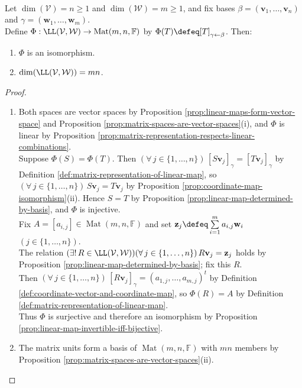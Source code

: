 \begin{theorem} \label{thm:linear-maps-and-matrices-same-data} \\
Let $\dim(\mathcal{V})=n\geq1$ and $\dim(\mathcal{W})=m\geq1$, and fix bases $\beta=(\mathbf{v}_1,\ldots,\mathbf{v}_n)$ and $\gamma=(\mathbf{w}_1,\ldots,\mathbf{w}_m)$.\\
Define $\Phi:\LL(\mathcal{V},\mathcal{W})\to\operatorname{Mat}(m,n,\mathbb{F})$ by $\Phi(T)\defeq[T]_{\gamma\leftarrow\beta}$. Then:
\begin{enumerate}[label=(\roman*)]
\setlength{\itemsep}{0pt}
\item $\Phi$ is an isomorphism.
\item $\dim(\LL(\mathcal{V},\mathcal{W}))=mn$.
\end{enumerate}
\begin{proof}
\begin{enumerate}[label=(\roman*)]
\setlength{\itemsep}{0pt}
\item Both spaces are vector spaces by Proposition \ref{prop:linear-maps-form-vector-space} and Proposition \ref{prop:matrix-spaces-are-vector-spaces}(i), and $\Phi$ is linear by Proposition \ref{prop:matrix-representation-respects-linear-combinations}.\\
Suppose $\Phi(S)=\Phi(T)$. Then $(\forall\,j\in\{1,\ldots,n\})\,[S\mathbf{v}_j]_{\gamma}=[T\mathbf{v}_j]_{\gamma}$ by Definition \ref{def:matrix-representation-of-linear-map}, so $(\forall\,j\in\{1,\ldots,n\})\,S\mathbf{v}_j=T\mathbf{v}_j$ by Proposition \ref{prop:coordinate-map-isomorphism}(ii). Hence $S=T$ by Proposition \ref{prop:linear-map-determined-by-basis}, and $\Phi$ is injective.\\
Fix $A=[a_{i,j}]\in\operatorname{Mat}(m,n,\mathbb{F})$ and set $\mathbf{z}_j\defeq\sum\limits_{i=1}^{m}a_{i,j}\mathbf{w}_i$ $(j\in\{1,\ldots,n\})$.\\
The relation $(\exists!\,R\in\LL(\mathcal{V},\mathcal{W}))(\forall\,j\in\{1,\ldots,n\})\,R\mathbf{v}_j=\mathbf{z}_j$ holds by Proposition \ref{prop:linear-map-determined-by-basis}; fix this $R$.\\
Then $(\forall\,j\in\{1,\ldots,n\})\,[R\mathbf{v}_j]_{\gamma}=(a_{1,j},\ldots,a_{m,j})^t$ by Definition \ref{def:coordinate-vector-and-coordinate-map}, so $\Phi(R)=A$ by Definition \ref{def:matrix-representation-of-linear-map}.\\
Thus $\Phi$ is surjective and therefore an isomorphism by Proposition \ref{prop:linear-map-invertible-iff-bijective}.
\item The matrix units form a basis of $\operatorname{Mat}(m,n,\mathbb{F})$ with $mn$ members by Proposition \ref{prop:matrix-spaces-are-vector-spaces}(ii).\\

\end{enumerate}
\end{proof}
\end{theorem}
